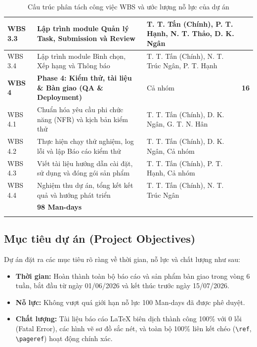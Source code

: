 \begin{longtable}{|>{\centering\arraybackslash}p{1.5cm}|>{\raggedright\arraybackslash}p{7.4cm}|>{\raggedright\arraybackslash}p{4.3cm}|>{\centering\arraybackslash}p{2.4cm}|}
WBS 3.3 & Lập trình module Quản lý Task, Submission và Review & T. T. Tấn (Chính), P. T. Hạnh, N. T. Thảo, D. K. Ngân & 8 \\ \hline
WBS 3.4 & Lập trình module Bình chọn, Xếp hạng và Thông báo & T. T. Tấn (Chính), N. T. Trúc Ngân, P. T. Hạnh & 8 \\ \hline
\textbf{WBS 4} & \textbf{Phase 4: Kiểm thử, tài liệu \& Bàn giao (QA \& Deployment)} & Cả nhóm & \textbf{16} \\ \hline
WBS 4.1 & Chuẩn hóa yêu cầu phi chức năng (NFR) và kịch bản kiểm thử & T. T. Tấn (Chính), D. K. Ngân, G. T. N. Hân & 6 \\ \hline
WBS 4.2 & Thực hiện chạy thử nghiệm, log lỗi và lập Báo cáo kiểm thử & T. T. Tấn (Chính), D. K. Ngân, Cả nhóm & 4 \\ \hline
WBS 4.3 & Viết tài liệu hướng dẫn cài đặt, sử dụng và đóng gói sản phẩm & T. T. Tấn (Chính), P. T. Hạnh, Cả nhóm & 4 \\ \hline
WBS 4.4 & Nghiệm thu dự án, tổng kết kết quả và hướng phát triển & T. T. Tấn (Chính), N. T. Trúc Ngân & 2 \\ \hline
\hline
\rowcolor{tableheader}
\multicolumn{3}{|r|}{\textbf{Tổng cộng nỗ lực ước lượng}} & \textbf{98 Man-days} \\ \hline
\caption{Cấu trúc phân tách công việc WBS và ước lượng nỗ lực của dự án}
\label{tab:spmp_wbs}
\end{longtable}

\subsection{Mục tiêu dự án (Project Objectives)}
\label{subsec:spmp_objectives}

Dự án đặt ra các mục tiêu rõ ràng về thời gian, nỗ lực và chất lượng như sau:
\begin{itemize}
    \item \textbf{Thời gian:} Hoàn thành toàn bộ báo cáo và sản phẩm bàn giao trong vòng 6 tuần, bắt đầu từ ngày 01/06/2026 và kết thúc trước ngày 15/07/2026.
    \item \textbf{Nỗ lực:} Không vượt quá giới hạn nỗ lực 100 Man-days đã được phê duyệt.
    \item \textbf{Chất lượng:} Tài liệu báo cáo LaTeX biên dịch thành công 100\% với 0 lỗi (Fatal Error), các hình vẽ sơ đồ sắc nét, và toàn bộ 100\% liên kết chéo (\texttt{\textbackslash ref}, \texttt{\textbackslash pageref}) hoạt động chính xác.
\end{itemize}

